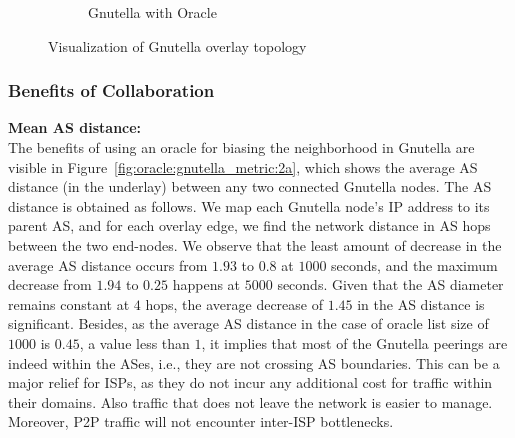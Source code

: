 \begin{figure}[tbp]
\begin{subfigure}[]{0.45\linewidth}
   \caption{Gnutella with Oracle}%
   \end{subfigure}   \caption{Visualization of Gnutella overlay topology}
   \label{fig:oracle:gnutella_topology}
\end{figure}




\subsubsection{Benefits of Collaboration}\label{sec:Benefits-Collaboration-P2P-results}


\noindent\textbf{Mean AS distance:} \\
The benefits of using an oracle for biasing the neighborhood in Gnutella are visible in
Figure~\ref{fig:oracle:gnutella_metric:2a}, which shows the average AS distance (in the underlay)
between any two connected Gnutella nodes. The AS distance is obtained as follows. We map
each Gnutella node's IP address to its parent AS, and for each overlay edge, we find the
network distance in AS hops between the two end-nodes.  We observe that the least amount
of decrease in the average AS distance occurs from $1.93$ to $0.8$ at $1000$ seconds, and
the maximum decrease from $1.94$ to $0.25$ happens at $5000$ seconds. Given that the AS
diameter remains constant at $4$ hops, the average decrease of $1.45$ in the AS distance
is significant. Besides, as the average AS distance in the case of oracle list size of
$1000$ is $0.45$, a value less than $1$, it implies that most of the Gnutella peerings are
indeed within the ASes, i.e., they are not crossing AS boundaries. This can be a major
relief for ISPs, as they do not incur any additional cost for traffic within their
domains. Also traffic that does not leave the network is easier to manage. Moreover, P2P
traffic will not encounter inter-ISP bottlenecks.


